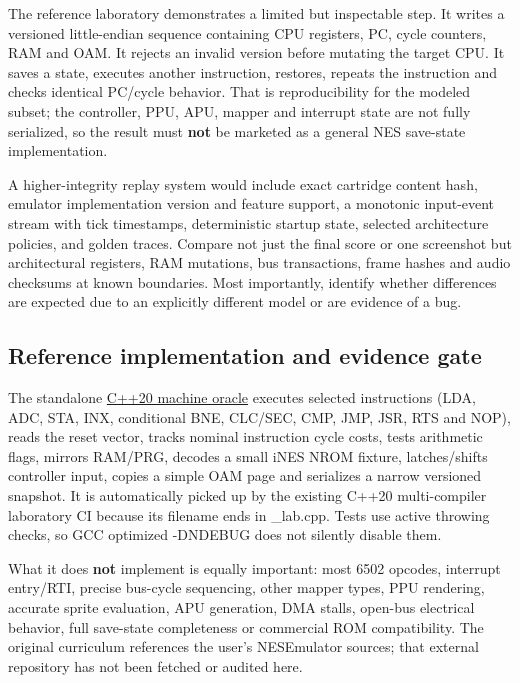 The reference laboratory demonstrates a limited but inspectable step. It writes a versioned little-endian sequence containing CPU registers, PC, cycle counters, RAM and OAM. It rejects an invalid version before mutating the target CPU. It saves a state, executes another instruction, restores, repeats the instruction and checks identical PC/cycle behavior. That is reproducibility for the modeled subset; the controller, PPU, APU, mapper and interrupt state are not fully serialized, so the result must \textbf{not} be marketed as a general NES save-state implementation.

A higher-integrity replay system would include exact cartridge content hash, emulator implementation version and feature support, a monotonic input-event stream with tick timestamps, deterministic startup state, selected architecture policies, and golden traces. Compare not just the final score or one screenshot but architectural registers, RAM mutations, bus transactions, frame hashes and audio checksums at known boundaries. Most importantly, identify whether differences are expected due to an explicitly different model or are evidence of a bug.

\subsection{Reference implementation and evidence gate}\label{06-engine-ii-ch042-reference-implementation-and-evidence-gate}

\hypertarget{06-engine-ii-ch042-reference-implementation-and-evidence-gate}{}

The standalone \hyperref[source-file-552a9e2296dc984412c8f06d]{C++20 machine oracle} executes selected instructions (LDA, ADC, STA, INX, conditional BNE, CLC/SEC, CMP, JMP, JSR, RTS and NOP), reads the reset vector, tracks nominal instruction cycle costs, tests arithmetic flags, mirrors RAM/PRG, decodes a small iNES NROM fixture, latches/shifts controller input, copies a simple OAM page and serializes a narrow versioned snapshot. It is automatically picked up by the existing C++20 multi-compiler laboratory CI because its filename ends in \_lab.cpp. Tests use active throwing checks, so GCC optimized -DNDEBUG does not silently disable them.

What it does \textbf{not} implement is equally important: most 6502 opcodes, interrupt entry/RTI, precise bus-cycle sequencing, other mapper types, PPU rendering, accurate sprite evaluation, APU generation, DMA stalls, open-bus electrical behavior, full save-state completeness or commercial ROM compatibility. The original curriculum references the user's NESEmulator sources; that external repository has not been fetched or audited here.

